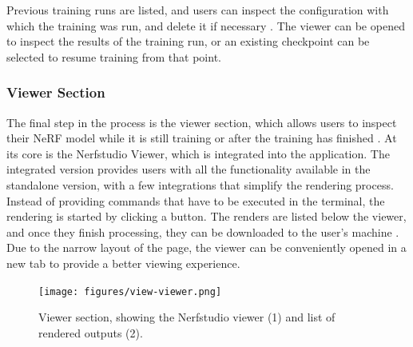 Previous training runs are listed, and users can inspect the configuration with which the training was run, and delete it if necessary .
The viewer can be opened to inspect the results of the training run, or an existing checkpoint can be selected to resume training from that point.

\subsubsection*{Viewer Section}

The final step in the process is the viewer section, which allows users to inspect their NeRF model while it is still training or after the training has finished .
At its core is the Nerfstudio Viewer, which is integrated into the application.
The integrated version provides users with all the functionality available in the standalone version, with a few integrations that simplify the rendering process.
Instead of providing commands that have to be executed in the terminal, the rendering is started by clicking a button.
The renders are listed below the viewer, and once they finish processing, they can be downloaded to the user's machine .
Due to the narrow layout of the page, the viewer can be conveniently opened in a new tab to provide a better viewing experience.

\begin{figure}[h!]
  \centering
  \texttt{[image: figures/view-viewer.png]}
  \caption{Viewer section, showing the Nerfstudio viewer (1) and list of rendered outputs (2).}
  \label{fig:design:viewer-section}
\end{figure}
